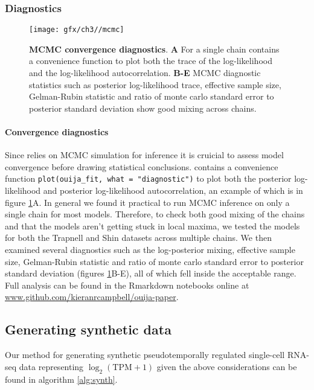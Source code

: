 \subsubsection{Diagnostics}

\begin{figure}
\centering
 \texttt{[image: gfx/ch3//mcmc]}
 \caption{\textbf{MCMC convergence diagnostics}. \textbf{A} For a single chain \sname contains a convenience function to plot both the trace of the log-likelihood and the log-likelihood autocorrelation. \textbf{B-E} MCMC diagnostic statistics such as posterior log-likelihood trace, effective sample size, Gelman-Rubin statistic and ratio of monte carlo standard error to posterior standard deviation show good mixing across chains.} \label{fig:mcmc}
 \end{figure}

\paragraph{Convergence diagnostics} Since \sname relies on MCMC simulation for inference it is cruicial to assess model convergence before drawing statistical conclusions. \sname contains a convenience function \texttt{plot(ouija\_fit, what = "diagnostic")} to plot both the posterior log-likelihood and posterior log-likelihood autocorrelation, an example of which is in figure \ref{fig:mcmc}A. In general we found it practical to run MCMC inference on only a single chain for most models. Therefore, to check both good mixing of the chains and that the models aren't getting stuck in local maxima, we tested the models for both the Trapnell and Shin datasets across multiple chains. We then examined several diagnostics such as the log-posterior mixing, effective sample size, Gelman-Rubin statistic and ratio of monte carlo standard error to posterior standard deviation (figures \ref{fig:mcmc}B-E), all of which fell inside the acceptable range. Full analysis can be found in the Rmarkdown notebooks online at \url{www.github.com/kieranrcampbell/ouija-paper}.

\subsection{Generating synthetic data}

Our method for generating synthetic pseudotemporally regulated single-cell RNA-seq data representing $\log_2(\text{TPM} + 1)$ given the above considerations can be found in algorithm \ref{alg:synth}.

